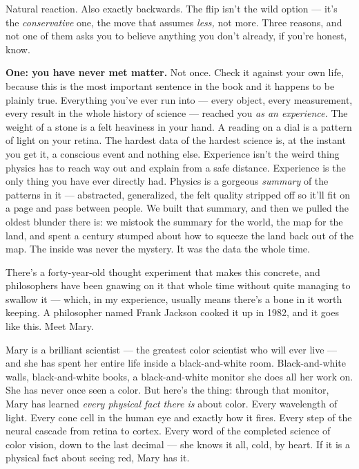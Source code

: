\documentclass[11pt,openany]{book}
\begin{document}
Natural reaction. Also exactly backwards. The flip isn’t the wild option — it’s the \textit{conservative} one, the move that assumes \textit{less,} not more. Three reasons, and not one of them asks you to believe anything you don’t already, if you’re honest, know.

\textbf{One: you have never met matter.} Not once. Check it against your own life, because this is the most important sentence in the book and it happens to be plainly true. Everything you’ve ever run into — every object, every measurement, every result in the whole history of science — reached you \textit{as an experience.} The weight of a stone is a felt heaviness in your hand. A reading on a dial is a pattern of light on your retina. The hardest data of the hardest science is, at the instant you get it, a conscious event and nothing else. Experience isn’t the weird thing physics has to reach way out and explain from a safe distance. Experience is the only thing you have ever directly had. Physics is a gorgeous \textit{summary} of the patterns in it — abstracted, generalized, the felt quality stripped off so it’ll fit on a page and pass between people. We built that summary, and then we pulled the oldest blunder there is: we mistook the summary for the world, the map for the land, and spent a century stumped about how to squeeze the land back out of the map. The inside was never the mystery. It was the data the whole time.

There’s a forty-year-old thought experiment that makes this concrete, and philosophers have been gnawing on it that whole time without quite managing to swallow it — which, in my experience, usually means there’s a bone in it worth keeping. A philosopher named Frank Jackson cooked it up in 1982, and it goes like this. Meet Mary.

Mary is a brilliant scientist — the greatest color scientist who will ever live — and she has spent her entire life inside a black-and-white room. Black-and-white walls, black-and-white books, a black-and-white monitor she does all her work on. She has never once seen a color. But here’s the thing: through that monitor, Mary has learned \textit{every physical fact there is} about color. Every wavelength of light. Every cone cell in the human eye and exactly how it fires. Every step of the neural cascade from retina to cortex. Every word of the completed science of color vision, down to the last decimal — she knows it all, cold, by heart. If it is a physical fact about seeing red, Mary has it.
\end{document}
